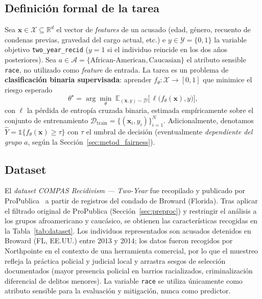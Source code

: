 \documentclass[11pt,a4paper]{article}
\begin{document}
\subsection{Definición formal de la tarea}

Sea $\bm{x}\in\mathcal{X}\subseteq\mathbb{R}^d$ el vector de \textit{features} de un acusado (edad, género, recuento de condenas previas, gravedad del cargo actual, etc.) e $y\in\mathcal{Y}=\{0,1\}$ la variable objetivo \texttt{two\_year\_recid} ($y{=}1$ si el individuo reincide en los dos años posteriores). Sea $a\in\mathcal{A}=\{\text{African-American},\text{Caucasian}\}$ el atributo sensible \texttt{race}, no utilizado como \textit{feature} de entrada. La tarea es un problema de \textbf{clasificación binaria supervisada}: aprender $f_\theta\colon\mathcal{X}\to[0,1]$ que minimice el riesgo esperado
\begin{equation}
    \theta^\star = \arg\min_\theta \;\mathbb{E}_{(\bm{x},y)\sim\mathcal{D}}\bigl[\,\ell\bigl(f_\theta(\bm{x}),y\bigr)\bigr],
    \label{eq:erm}
\end{equation}
con $\ell$ la pérdida de entropía cruzada binaria, estimada empíricamente sobre el conjunto de entrenamiento $\mathcal{D}_{\text{train}}=\{(\bm{x}_i,y_i)\}_{i=1}^{N}$. Adicionalmente, denotamos $\hat{Y}=\mathbb{1}\{f_\theta(\bm{x})\geq\tau\}$ con $\tau$ el umbral de decisión (eventualmente \emph{dependiente del grupo} $a$, según la Sección~\ref{sec:metod_fairness}).

\subsection{Dataset}

El \textit{dataset} \textit{COMPAS Recidivism — Two-Year} fue recopilado y publicado por ProPublica~\cite{propublica_compas_2016} a partir de registros del condado de Broward (Florida). Tras aplicar el filtrado original de ProPublica (Sección~\ref{sec:preproc}) y restringir el análisis a los grupos afroamericano y caucásico, se obtienen las características recogidas en la Tabla~\ref{tab:dataset}. Los individuos representados son acusados detenidos en Broward (FL, EE.UU.) entre 2013 y 2014; los datos fueron recogidos por Northpointe en el contexto de una herramienta comercial, por lo que el muestreo refleja la práctica policial y judicial local y arrastra sesgos de selección documentados (mayor presencia policial en barrios racializados, criminalización diferencial de delitos menores). La variable \texttt{race} se utiliza únicamente como atributo sensible para la evaluación y mitigación, nunca como predictor.
\end{document}

